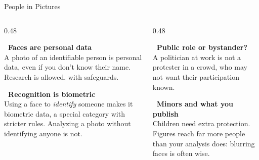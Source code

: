 \begin{frame}{People in Pictures}
\begin{columns}[T]
\begin{column}{0.48\textwidth}
\begin{warnbox}
\textbf{\faUserShield\ Faces are personal data}\\
A photo of an identifiable person is personal data, even if you don't know their name.
Research is allowed, with safeguards.
\end{warnbox}
\begin{warnbox}
\textbf{\faFingerprint\ Recognition is biometric}\\
Using a face to \emph{identify} someone makes it biometric data, a special category with stricter
rules. Analyzing a photo without identifying anyone is not.
\end{warnbox}
\end{column}
\begin{column}{0.48\textwidth}
\begin{warnbox}
\textbf{\faUserTie\ Public role or bystander?}\\
A politician at work is not a protester in a crowd, who may not want their participation known.
\end{warnbox}
\begin{warnbox}
\textbf{\faChild\ Minors and what you publish}\\
Children need extra protection. Figures reach far more people than your analysis does: blurring
faces is often wise.
\end{warnbox}
\end{column}
\end{columns}
\end{frame}

